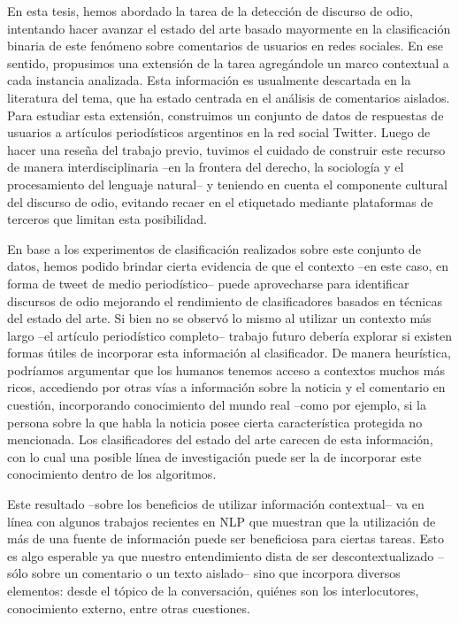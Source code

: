 En esta tesis, hemos abordado la tarea de la detección de discurso de odio, intentando hacer avanzar el estado del arte basado mayormente en la clasificación binaria de este fenómeno sobre comentarios de usuarios en redes sociales. En ese sentido, propusimos una extensión de la tarea agregándole un marco contextual a cada instancia analizada. Esta información es usualmente descartada en la literatura del tema, que ha estado centrada en el análisis de comentarios aislados. Para estudiar esta extensión, construimos un conjunto de datos de respuestas de usuarios a artículos periodísticos argentinos en la red social Twitter. Luego de hacer una reseña del trabajo previo, tuvimos el cuidado de construir este recurso de manera interdisciplinaria --en la frontera del derecho, la sociología y el procesamiento del lenguaje natural-- y teniendo en cuenta el componente cultural del discurso de odio, evitando recaer en el etiquetado mediante plataformas de terceros que limitan esta posibilidad.


En base a los experimentos de clasificación realizados sobre este conjunto de datos, hemos podido brindar cierta evidencia de que el contexto --en este caso, en forma de tweet de medio periodístico-- puede aprovecharse para identificar discursos de odio mejorando el rendimiento de clasificadores basados en técnicas del estado del arte. Si bien no se observó lo mismo al utilizar un contexto más largo --el artículo periodístico completo-- trabajo futuro debería explorar si existen formas útiles de incorporar esta información al clasificador. De manera heurística, podríamos argumentar que los humanos tenemos acceso a contextos muchos más ricos, accediendo por otras vías a información sobre la noticia y el comentario en cuestión, incorporando conocimiento del mundo real --como por ejemplo, si la persona sobre la que habla la noticia posee cierta característica protegida no mencionada. Los clasificadores del estado del arte carecen de esta información, con lo cual una posible línea de investigación puede ser la de incorporar este conocimiento dentro de los algoritmos.

Este resultado --sobre los beneficios de utilizar información contextual-- va en línea con algunos trabajos recientes en NLP que muestran que la utilización de más de una fuente de información puede ser beneficiosa para ciertas tareas. Esto es algo esperable ya que nuestro entendimiento dista de ser descontextualizado --sólo sobre un comentario o un texto aislado-- sino que incorpora diversos elementos: desde el tópico de la conversación, quiénes son los interlocutores, conocimiento externo, entre otras cuestiones.

